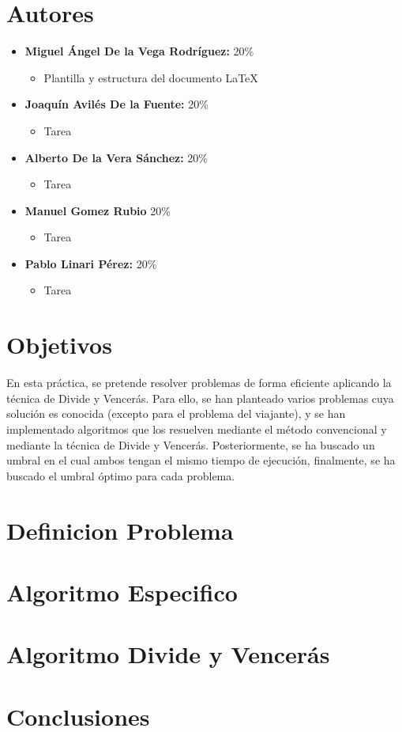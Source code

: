 \documentclass[11pt,openany]{book}
\begin{document}
\tableofcontents %
\newpage %


\chapter{Autores}
\begin{itemize}
    \item \textbf{Miguel Ángel De la Vega Rodríguez:} 20\%
          \begin{itemize}
              \item Plantilla y estructura del documento \LaTeX
          \end{itemize}
    \item \textbf{Joaquín Avilés De la Fuente:} 20\%
          \begin{itemize}
            \item Tarea
          \end{itemize}
    \item \textbf{Alberto De la Vera Sánchez: } 20\%
          \begin{itemize}
            \item Tarea
          \end{itemize}
    \item \textbf{Manuel Gomez Rubio} 20\%
          \begin{itemize}
            \item Tarea
          \end{itemize}
    \item \textbf{Pablo Linari Pérez:} 20\%
          \begin{itemize}
            \item Tarea
          \end{itemize}
\end{itemize}

\chapter{Objetivos}
En esta práctica, se pretende resolver problemas de forma eficiente aplicando la técnica de
Divide y Vencerás. Para ello, se han planteado varios problemas cuya solución es conocida
(excepto para el problema del viajante), y se han implementado algoritmos que los resuelven
mediante el método convencional y mediante la técnica de Divide y Vencerás. Posteriormente, se ha buscado
un umbral en el cual ambos tengan el mismo tiempo de ejecución, finalmente, se ha buscado el 
umbral óptimo para cada problema. 
\chapter{Definicion Problema}
\chapter{Algoritmo Especifico}
\chapter{Algoritmo Divide y Vencerás}
\chapter{Conclusiones}
\end{document}
